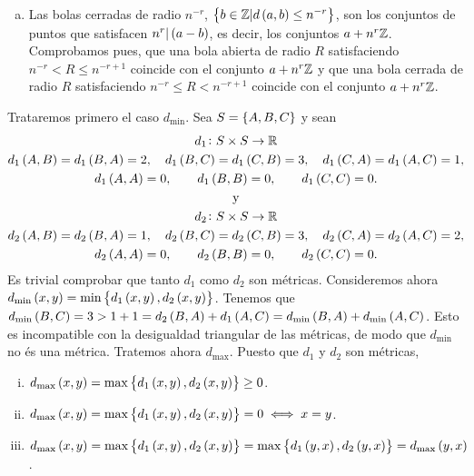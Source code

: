 \begin{eje}
\begin{enumerate}[(a)]
        \item Las bolas cerradas de radio $n^{-r}$, $\left\{ b \in \mathbb{Z} | d\left( a, b \right) \leq n^{-r} \right\}$, son los conjuntos de puntos que satisfacen $n^r | \left( a-b \right)$, es decir, los conjuntos $a+n^r \mathbb{Z}$. Comprobamos pues, que una bola abierta de radio $R$ satisfaciendo $n^{-r} < R \leq n^{-r+1}$ coincide con el conjunto $a+n^r \mathbb{Z}$ y  que una bola cerrada de radio $R$ satisfaciendo $n^{-r} \leq R < n^{-r+1}$ coincide con el conjunto $a+n^r \mathbb{Z}$.
    \end{enumerate}
\end{eje}

\begin{eje}
    Trataremos primero el caso $d_{\min}$. Sea $S=\left\{ A, B, C \right\}$ y sean
    \begin{gather*}
        d_1 \colon S \times S \to \mathbb{R} \\
        d_1\left( A, B \right)= d_1 \left( B, A \right)=2, \quad d_1\left( B, C \right)= d_1 \left( C, B \right)=3, \quad d_1\left( C, A \right)= d_1 \left( A, C \right)=1, \\
        d_1\left( A, A \right)=0, \qquad d_1\left( B, B \right)=0, \qquad d_1\left( C, C \right)=0. \\
        \text{y}\\
        d_2 \colon S \times S \to \mathbb{R} \\
        d_2\left( A, B \right)= d_2 \left( B, A \right)=1, \quad d_2\left( B, C \right)= d_2 \left( C, B \right)=3, \quad d_2\left( C, A \right)= d_2 \left( A, C \right)=2, \\
        d_2\left( A, A \right)=0, \qquad d_2\left( B, B \right)=0, \qquad d_2\left( C, C \right)=0. \\
    \end{gather*}
    Es trivial comprobar que tanto $d_1$ como $d_2$ son métricas. Consideremos ahora $d_{\min}\left( x, y \right) = \min \left\{ d_1\left( x, y \right), d_2 \left( x, y \right) \right\}$. Tenemos que $d_{\min}\left( B, C\right) = 3 > 1+1= d_2\left( B, A \right) + d_1 \left( A, C \right) = d_{\min}\left( B, A\right)+d_{\min}\left( A, C\right)$. Esto es incompatible con la desigualdad triangular de las métricas, de modo que $d_{\min}$ no és una métrica.  Tratemos ahora $d_{\max}$. Puesto que $d_1$ y $d_2$ son métricas,
    \begin{enumerate}[i)]
        \item $d_{\max} \left( x, y \right) = \max \left\{ d_1 \left( x, y \right), d_2 \left( x, y \right) \right\} \geq 0$.
        \item $d_{\max} \left( x, y \right) = \max \left\{ d_1 \left( x, y \right), d_2 \left( x, y \right) \right\} = 0 \iff x=y$.
        \item $d_{\max} \left( x, y \right) = \max \left\{ d_1 \left( x, y \right), d_2 \left( x, y \right) \right\} = \max \left\{ d_1 \left( y, x \right), d_2 \left( y, x \right) \right\} = d_{\max} \left( y, x \right)$.

\end{enumerate}
\end{eje}
